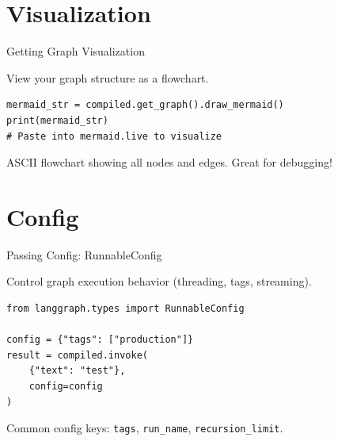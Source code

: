 \documentclass[aspectratio=169,11pt]{beamer}
\begin{document}
\section{Visualization}
\begin{frame}[fragile,t]{Getting Graph Visualization}
\vspace{0.1cm}

\begin{conceptbox}
View your graph structure as a flowchart.
\end{conceptbox}

\vspace{0.1cm}

\begin{codebox}
\begin{lstlisting}
mermaid_str = compiled.get_graph().draw_mermaid()
print(mermaid_str)
# Paste into mermaid.live to visualize
\end{lstlisting}
\end{codebox}

\vspace{0.15cm}

\begin{tipbox}[Output]
ASCII flowchart showing all nodes and edges. Great for debugging!
\end{tipbox}
\end{frame}

\section{Config}
\begin{frame}[fragile,t]{Passing Config: RunnableConfig}
\vspace{0.1cm}

\begin{conceptbox}
Control graph execution behavior (threading, tags, streaming).
\end{conceptbox}

\vspace{0.1cm}

\begin{codebox}[Example]
\begin{lstlisting}
from langgraph.types import RunnableConfig

config = {"tags": ["production"]}
result = compiled.invoke(
    {"text": "test"},
    config=config
)
\end{lstlisting}
\end{codebox}

\vspace{0.15cm}

{\footnotesize Common config keys: \texttt{tags}, \texttt{run\_name}, \texttt{recursion\_limit}.}
\end{frame}
\end{document}
